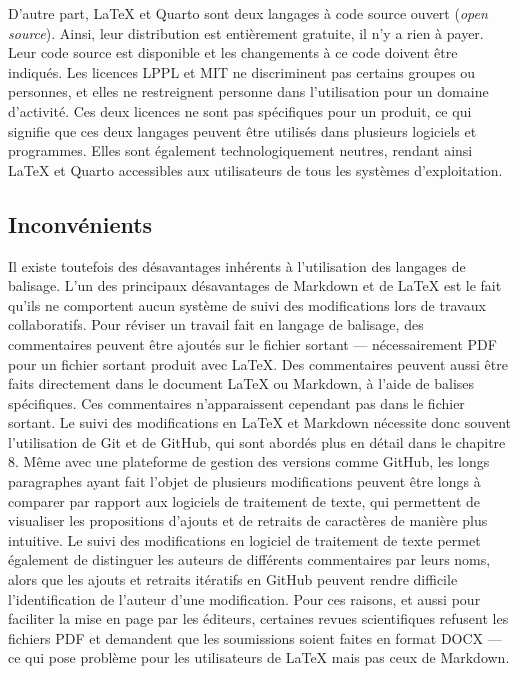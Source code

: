 \documentclass[
  letterpaper,
  DIV=11,
  numbers=noendperiod]{scrreprt}
\begin{document}
D'autre part, LaTeX et Quarto sont deux langages à code source ouvert
(\emph{open source}). Ainsi, leur distribution est entièrement gratuite,
il n'y a rien à payer. Leur code source est disponible et les
changements à ce code doivent être indiqués. Les licences LPPL et MIT ne
discriminent pas certains groupes ou personnes, et elles ne restreignent
personne dans l'utilisation pour un domaine d'activité. Ces deux
licences ne sont pas spécifiques pour un produit, ce qui signifie que
ces deux langages peuvent être utilisés dans plusieurs logiciels et
programmes. Elles sont également technologiquement neutres, rendant
ainsi LaTeX et Quarto accessibles aux utilisateurs de tous les systèmes
d'exploitation.

\subsection{Inconvénients}\label{inconvuxe9nients-1}

Il existe toutefois des désavantages inhérents à l'utilisation des
langages de balisage. L'un des principaux désavantages de Markdown et de
LaTeX est le fait qu'ils ne comportent aucun système de suivi des
modifications lors de travaux collaboratifs. Pour réviser un travail
fait en langage de balisage, des commentaires peuvent être ajoutés sur
le fichier sortant --- nécessairement PDF pour un fichier sortant
produit avec LaTeX. Des commentaires peuvent aussi être faits
directement dans le document LaTeX ou Markdown, à l'aide de balises
spécifiques. Ces commentaires n'apparaissent cependant pas dans le
fichier sortant. Le suivi des modifications en LaTeX et Markdown
nécessite donc souvent l'utilisation de Git et de GitHub, qui sont
abordés plus en détail dans le chapitre 8. Même avec une plateforme de
gestion des versions comme GitHub, les longs paragraphes ayant fait
l'objet de plusieurs modifications peuvent être longs à comparer par
rapport aux logiciels de traitement de texte, qui permettent de
visualiser les propositions d'ajouts et de retraits de caractères de
manière plus intuitive. Le suivi des modifications en logiciel de
traitement de texte permet également de distinguer les auteurs de
différents commentaires par leurs noms, alors que les ajouts et retraits
itératifs en GitHub peuvent rendre difficile l'identification de
l'auteur d'une modification. Pour ces raisons, et aussi pour faciliter
la mise en page par les éditeurs, certaines revues scientifiques
refusent les fichiers PDF et demandent que les soumissions soient faites
en format DOCX --- ce qui pose problème pour les utilisateurs de LaTeX
mais pas ceux de Markdown.
\end{document}
